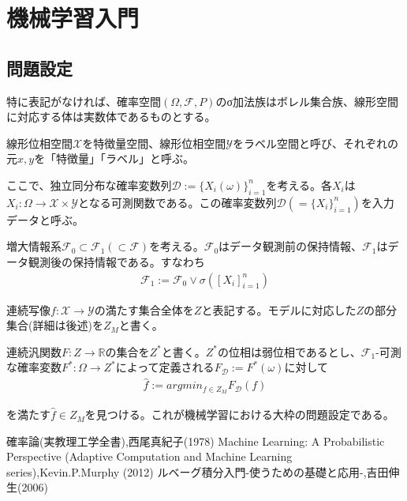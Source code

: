 \documentclass{jsarticle}
\begin{document}
\section{機械学習入門}
\subsection{問題設定}
特に表記がなければ、確率空間$(\Omega,\mathcal{F},P)$のσ加法族はボレル集合族、線形空間に対応する体は実数体であるものとする。

線形位相空間$\mathcal{X}$を特徴量空間、線形位相空間$\mathcal{Y}$をラベル空間と呼び、それぞれの元$x,y$を「特徴量」「ラベル」と呼ぶ。

ここで、独立同分布な確率変数列$\mathcal{D}:=\{X_i(\omega)\}_{i=1}^n$を考える。各$X_i$は$X_i:\Omega\rightarrow\mathcal{X}\times\mathcal{Y}$となる可測関数である。この確率変数列$\mathcal{D}(=\{X_i\}_{i=1}^n)$を入力データと呼ぶ。

増大情報系$\mathcal{F}_0\subset\mathcal{F}_1(\subset\mathcal{F})$を考える。$\mathcal{F}_0$はデータ観測前の保持情報、$\mathcal{F}_1$はデータ観測後の保持情報である。すなわち
\begin{align}
\mathcal{F}_1:=\mathcal{F}_0\vee\sigma([X_i]^n_{i=1})
\end{align}

連続写像$f:\mathcal{X}\rightarrow\mathcal{Y}$の満たす集合全体を$Z$と表記する。モデルに対応した$Z$の部分集合(詳細は後述)を$Z_M$と書く。

連続汎関数$F:Z\rightarrow\mathbb{R}$の集合を$Z^*$と書く。$Z^*$の位相は弱位相であるとし、$\mathcal{F}_1$-可測な確率変数$F^*:\Omega\rightarrow Z^*$によって定義される$F_\mathcal{D}:=F^*(\omega)$に対して
\begin{align}
\hat{f}:=argmin_{f\in Z_M}F_\mathcal{D}(f)
\end{align}

を満たす$\hat{f}\in Z_M$を見つける。これが機械学習における大枠の問題設定である。



\newpage
\begin{thebibliography}{99}
   確率論(実教理工学全書),西尾真紀子(1978)
   Machine Learning: A Probabilistic Perspective (Adaptive Computation and Machine Learning series),Kevin.P.Murphy (2012)
   ルベーグ積分入門-使うための基礎と応用-,吉田伸生(2006)
\end{thebibliography}
\end{document}
